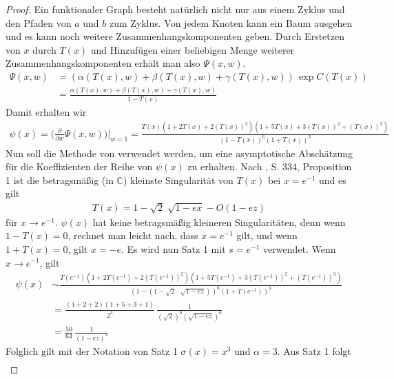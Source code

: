\documentclass[a4paper, 10pt, ngerman]{article}
\newcommand{\C}{\mathbb{C}}
\begin{document}
\begin{proof}
    Ein funktionaler Graph besteht natürlich nicht nur aus einem Zyklus und den Pfaden von $a$ und $b$ zum Zyklus. Von jedem Knoten kann ein Baum ausgehen und es kann noch weitere Zusammenhangskomponenten geben. Durch Erstetzen von $x$ durch $T(x)$ und Hinzufügen einer beliebigen Menge weiterer Zusammenhangskomponenten erhält man also $\Psi(x, w)$.
    \begin{align*}
        \Psi(x, w)
         & = (\alpha(T(x), w) + \beta(T(x), w) + \gamma(T(x), w)) \,
        \exp C(T(x))                                                    \\
         & = \frac {\alpha(T(x), w) + \beta(T(x), w) + \gamma(T(x), w)}
        {1 - T(x)}
    \end{align*}
    Damit erhalten wir
    \begin{align*}
        \psi(x) = \Bigg (\frac {\partial} {\partial w}
        \Psi(x, w) \Bigg ) \Bigg \vert_{w = 1}
        = \frac
        {T(x)(1 + 2T(x) + 2(T(x))^2)(1 + 5T(x) + 3(T(x))^2 + (T(x))^3)}
        {(1 - T(x))^6(1 + T(x))^3}
    \end{align*}
    Nun soll die Methode von \cite{fo90} verwendet werden, um eine asymptotische Abschätzung für die Koeffizienten der Reihe von $\psi(x)$ zu erhalten. Nach \cite{fo90}, S. 334, Proposition 1 ist die betragsmäßig (in $\C$) kleinste Singularität von $T(x)$ bei $x = e^{-1}$ und es gilt
    \begin{align*}
        T(x) = 1 - \sqrt{2} \; \sqrt {1 - ex} - O(1 - ez)
    \end{align*}
    für $x \to e^{-1}$. $\psi(x)$ hat keine betragsmäßig kleineren Singularitäten, denn wenn $1 - T(x) = 0$, rechnet man leicht nach, dass $x = e^{-1}$ gilt, und wenn $1 + T(x) = 0$, gilt $x = -e$. Es wird nun Satz 1 mit $s = e^{-1}$ verwendet. Wenn $x \to e^{-1}$, gilt
    \begin{align*}
        \psi(x)
         & \sim \frac {T(e^{-1})(1 + 2T(e^{-1})
            + 2(T(e^{-1}))^2)(1 + 5T(e^{-1}) + 3(T(e^{-1}))^2 + (T(e^{-1}))^3)}
        {(1 - (1 - \sqrt 2 \cdot \sqrt {1 - ez}))^6(1 + T(e^{-1}))^3} \\
         & = \frac {(1 + 2 + 2)(1 + 5 + 3 + 1)} {2^3} \,
        \frac 1 {(\sqrt 2 )^6 (\sqrt{1 - ez})^6}                      \\
         & = \frac {50} {64} \, \frac 1 {(1 - ez)^3}
    \end{align*}
    Folglich gilt mit der Notation von Satz 1 $\sigma(x) = x^3$ und $\alpha = 3$. Aus Satz 1 folgt
    \begin{align*}

\end{align*}
\end{proof}
\end{document}
